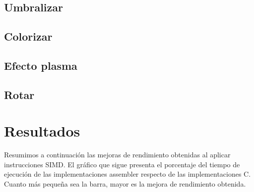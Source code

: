 \documentclass[a4paper,10pt,twoside]{article}
\begin{document}


\subsection{Umbralizar}



\subsection{Colorizar}



\subsection{Efecto plasma}



\subsection{Rotar}






\section{Resultados}

Resumimos a continuación las mejoras de rendimiento obtenidas al aplicar instrucciones SIMD. El gráfico que sigue presenta el porcentaje del tiempo de ejecución de las implementaciones assembler respecto de las implementaciones C. Cuanto más pequeña sea la barra, mayor es la mejora de rendimiento obtenida.
\end{document}
